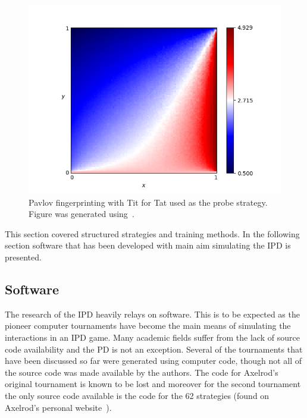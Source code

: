 \documentclass{article}
\theoremstyle{definition}
\begin{document}
\begin{figure}[!hbtp]
    \centering
    \includegraphics[height=.3\textheight]{./assets/images/Win-Stay_Lose-Shift.png}
    \caption{Pavlov fingerprinting with Tit for Tat used as the probe strategy.
    Figure was generated using~\cite{axelrodproject}.}
    \label{fig:fingerprinting}
\end{figure}

This section covered structured strategies and training methods. In the following
section software that has been developed with main aim simulating the IPD
is presented.

\subsection{Software}\label{section:software}

The research of the IPD heavily relays on software.
This is to be expected as the pioneer computer tournaments have become the main
means of simulating the interactions in an IPD game.
Many academic fields suffer from the lack of source code availability and the PD
is not an exception. Several of the tournaments that have been discussed so far were generated
using computer code, though not all of the source code was made available by the authors.
The code for Axelrod's original tournament is known to be lost and
moreover for the second tournament the only source code available is the code
for the 62 strategies (found on Axelrod's personal website~\cite{fortan_code}).
\end{document}

